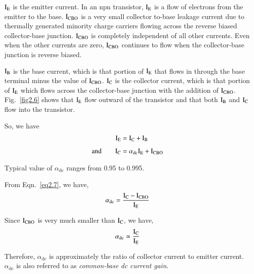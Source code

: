 $\textrm{I}_{\textrm{E}}$ is the emitter current. In an npn transistor, $\textrm{I}_{\textrm{E}}$ is a flow of electrons from the emitter to the base. $\textrm{I}_{\text{CBO}}$ is a very small collector to-base leakage current due to thermally generated minority charge carriers flowing across the reverse biased collector-base junction. $\textrm{I}_{\text{CBO}}$ is completely independent of all other currents. Even when the other currents are zero, $\textrm{I}_{\text{CBO}}$ continues to flow when the collector-base junction is reverse biased.

$\textrm{I}_{\textrm{B}}$ is the base current, which is that portion of $\textrm{I}_{\textrm{E}}$ that flows in through the base terminal minus the value of $\textrm{I}_{\text{CBO}}$. $\textrm{I}_{\textrm{C}}$ is the collector current, which is that portion of $\textrm{I}_{\textrm{E}}$ which flows across the collector-base junction with the addition of $\textrm{I}_{\text{CBO}}$. Fig.~\ref{fig2.6} shows that $\textrm{I}_{\textrm{E}}$ flow outward of the transistor and that both $\textrm{I}_{\textrm{B}}$ and $\textrm{I}_{\textrm{C}}$ flow into the transistor.

So, we have
\begin{align}
\textrm{I}_{\textrm{E}} &= \textrm{I}_{\textrm{C}}+\textrm{I}_{\textrm{B}}\label{eq2.6}\\[4pt]
\text{and}\qquad \textrm{I}_{\textrm{C}} &= \alpha_{\text{dc}}\textrm{I}_{\textrm{E}}+\textrm{I}_{\text{CBO}}\label{eq2.7}
\end{align}

Typical value of $\alpha_{\text{dc}}$ ranges from 0.95 to 0.995.

From Eqn.~\eqref{eq2.7}, we have,
\begin{equation}
\alpha_{\text{dc}} = \frac{\textrm{I}_{\textrm{C}}-\textrm{I}_{\text{CBO}}}{\textrm{I}_{\textrm{E}}}\label{eq2.8}
\end{equation}

Since $\textrm{I}_{\text{CBO}}$ is very much smaller than $\textrm{I}_{\textrm{C}}$, we have,
\begin{equation}
\alpha_{\text{dc}}\simeq \frac{\textrm{I}_{\textrm{C}}}{\textrm{I}_{\textrm{E}}}\label{eq2.9}
\end{equation}

Therefore, $\alpha_{\text{dc}}$ is approximately the ratio of collector current to emitter current. $\alpha_{\text{dc}}$ is also referred to as {\em common-base dc current gain}.

